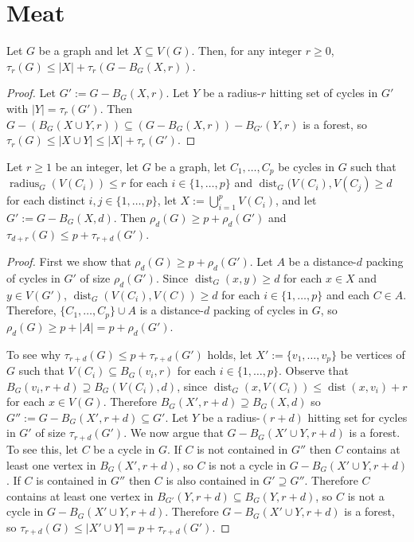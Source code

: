 \documentclass{patmorin}
\renewcommand{\ge}{\geqslant}
\renewcommand{\le}{\leqslant}
\DeclareMathOperator{\radius}{radius}
\DeclareMathOperator{\dist}{dist}
\begin{document}
\section{Meat}

\begin{lem}\label{hitting_is_additive}
  Let $G$ be a graph and let $X\subseteq V(G)$.  Then, for any integer $r\ge 0$, $\tau_r(G) \le |X| + \tau_r(G-B_G(X,r))$.
\end{lem}

\begin{proof}
  Let $G':=G-B_G(X,r)$.
  Let $Y$ be a radius-$r$ hitting set of cycles in $G'$ with $|Y|=\tau_r(G')$.  Then $G-(B_G(X\cup Y,r))\subseteq (G-B_G(X,r))-B_{G'}(Y,r)$ is a forest, so $\tau_r(G)\le |X\cup Y|\le |X|+\tau_r(G')$.
\end{proof}

\begin{lem}\label{fattening}
  Let $r\ge 1$ be an integer, let $G$ be a graph, let $C_1,\ldots,C_p$ be cycles in $G$ such that $\radius_G(V(C_i))\le r$ for each $i\in\{1,\ldots,p\}$ and $\dist_G(V(C_i),V(C_j)\ge d$ for each distinct $i,j\in\{1,\ldots,p\}$, let $X:=\bigcup_{i=1}^p V(C_i)$, and let $G':=G-B_G(X,d)$.  Then $\rho_d(G)\ge p + \rho_d(G')$ and
  $\tau_{d+r}(G) \le p + \tau_{r+d}(G')$.
\end{lem}

\begin{proof}
  First we show that $\rho_{d}(G)\ge p+\rho_d(G')$.
  Let $A$ be a distance-$d$ packing of cycles in $G'$ of size $\rho_d(G')$.  Since $\dist_G(x,y)\ge d$ for each $x\in X$ and $y\in V(G')$, $\dist_G(V(C_i),V(C))\ge d$ for each $i\in\{1,\ldots,p\}$ and each $C\in A$. Therefore, $\{C_1,\ldots,C_p\}\cup A$ is a distance-$d$ packing of cycles in $G$, so $\rho_d(G)\ge p + |A| = p + \rho_d(G')$.

  To see why $\tau_{r+d}(G) \le p + \tau_{r+d}(G')$ holds,  let $X':=\{v_1,\ldots,v_p\}$ be vertices of $G$ such that $V(C_i)\subseteq B_G(v_i,r)$ for each $i\in\{1,\ldots,p\}$.  Observe that $B_G(v_i,r+d)\supseteq B_G(V(C_i),d)$, since $\dist_G(x,V(C_i))\le \dist(x,v_i)+r$ for each $x\in V(G)$.   Therefore $B_G(X',r+d)\supseteq B_G(X,d)$ so $G'':=G-B_G(X',r+d)\subseteq G'$.  Let $Y$ be a radius-$(r+d)$ hitting set for cycles in $G'$ of size $\tau_{r+d}(G')$.  We now argue that $G-B_G(X'\cup Y,r+d)$ is a forest. To see this, let $C$ be a cycle in $G$.  If $C$ is not contained in $G''$ then $C$ contains at least one vertex in $B_G(X',r+d)$, so $C$ is not a cycle in $G-B_G(X'\cup Y,r+d)$.  If $C$ is contained in $G''$ then $C$ is also contained in $G'\supseteq G''$.  Therefore $C$ contains at least one vertex in $B_{G'}(Y,r+d)\subseteq B_G(Y,r+d)$, so $C$ is not a cycle in $G-B_G(X'\cup Y,r+d)$. Therefore  $G-B_G(X'\cup Y,r+d)$ is a forest, so $\tau_{r+d}(G)\le |X'\cup Y| = p+\tau_{r+d}(G')$.
\end{proof}
\end{document}
